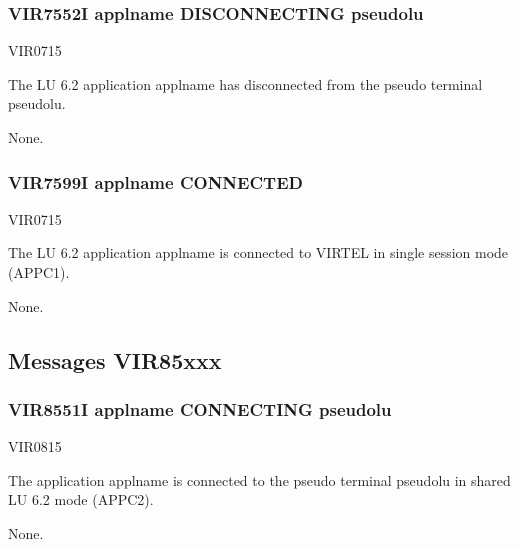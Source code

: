 \documentclass[letterpaper,10pt,english]{sphinxmanual}
\begin{document}
\subsubsection{VIR7552I applname DISCONNECTING pseudolu}
\label{\detokenize{messages:vir7552i-applname-disconnecting-pseudolu}}\begin{description}
\sphinxAtStartPar
VIR0715

\sphinxAtStartPar
The LU 6.2 application applname has disconnected from the pseudo terminal pseudolu.

\sphinxAtStartPar
None.

\end{description}


\subsubsection{VIR7599I applname CONNECTED}
\label{\detokenize{messages:vir7599i-applname-connected}}\begin{description}
\sphinxAtStartPar
VIR0715

\sphinxAtStartPar
The LU 6.2 application applname is connected to VIRTEL in single session mode (APPC1).

\sphinxAtStartPar
None.

\end{description}


\subsection{Messages VIR85xxx}
\label{\detokenize{messages:messages-vir85xxx}}

\subsubsection{VIR8551I applname CONNECTING pseudolu}
\label{\detokenize{messages:vir8551i-applname-connecting-pseudolu}}\begin{description}
\sphinxAtStartPar
VIR0815

\sphinxAtStartPar
The application applname is connected to the pseudo terminal pseudolu in shared LU 6.2 mode (APPC2).

\sphinxAtStartPar
None.

\end{description}
\end{document}
